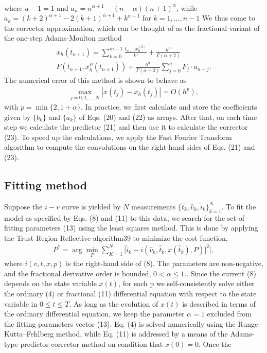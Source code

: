 \documentclass{article}
\begin{document}
{\begin{multicols}{2}
\begin{align}
\end{align}
where $a-1 = 1$ and $a_n = n^{\alpha + 1}-(n-\alpha)(n+1)^\alpha$, while $a_k = (k+2)^{\alpha + 1} - 2(k+1)^{\alpha + 1} + k^{\alpha + 1}$ for $k = 1, ..., n-1$ We thus come to the corrector approximation, which can be thought of as the fractional variant of the one-step Adams-Moulton method
\begin{align}
   x_h(t_{n+1})=\sum_{k=0}^{m-1} \frac{t_{n+1}x_0^{(k)}}{k!} + \frac{h^\alpha}{\Gamma (\alpha + 2)} \\ F(t_{n+1}, x_h^P (t_{n+1})) + \frac{h^\alpha}{\Gamma (\alpha + 2)} \sum_{j=0}^n F_j \cdot a_{n-j}.
\end{align}
The numerical error of this method is shown to behave as
\begin{align}
   \max_{j=0,1,...,N} |x(t_j)-x_h(t_j)|=O(h^p),
\end{align}
with $p=\min\{2,1+\alpha\}$. In practice, we first calculate and store the coefficients given by $\{b_k\}$ and $\{a_k\}$ of Eqs. (20) and (22) as arrays. After that, on each time step we calculate the predictor (21) and then use it to calculate the corrector (23). To speed up the calculations, we apply the Fast Fourier Transform algorithm to compute the convolutions on the right-hand sides of Eqs. (21) and (23).
{\centering \subsection{Fitting method}}
Suppose the $i-v$ curve is yielded by $N$ measurements $\{\hat{t}_k, \hat{v}_k, \hat{i}_k\}_{k=1}^N$. To fit the model as specified by Eqs. (8) and (11) to this data, we search for the set of fitting
parameters (13) using the least squares method. This is done by applying the Trust Region Reflective algorithm39 to minimize the cost function,
\begin{align}
   P^* = \arg \min_P \sum_{K=1}^N \biggl[\hat{i}_k-i(\hat{v}_k,\hat{t}_k, x(\hat{t}_k),P)]^2 \biggr],
\end{align}
where $i(v, t, x, p)$ is the right-hand side of (8). The parameters are non-negative, and the fractional derivative order is bounded, $0 < \alpha \le 1.$. Since the current (8) depends on the state variable $x(t)$, for each p we self-consistently solve either the ordinary (4) or fractional (11) differential equation with respect to the state variable in $0 \le t \le T$. As long as the evolution of $x(t)$ is described in terms of the ordinary differential equation, we keep the parameter $\alpha = 1$ excluded from the fitting parameters vector (13). Eq. (4) is solved numerically using the Runge–Kutta–Fehlberg method, while Eq. (11) is addressed by a means of the Adams-type predictor corrector method on condition that $x(0) = 0$. Once the \\

\end{multicols}}
\end{document}
